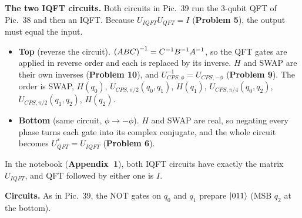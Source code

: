 \documentclass[a4paper, 10pt]{article}
\begin{document}
\begin{solution}
	\noindent \textbf{The two IQFT circuits.} Both circuits in Pic.~39 run the 3-qubit QFT of Pic.~38 and then an IQFT. Because \( U_{IQFT}U_{QFT} = I \) (\textbf{Problem 5}), the output must equal the input.
	\begin{itemize}
		\item \textbf{Top} (reverse the circuit). \( \left(ABC\right)^{-1} = C^{-1}B^{-1}A^{-1} \), so the QFT gates are applied in reverse order and each is replaced by its inverse. \( H \) and SWAP are their own inverses (\textbf{Problem 10}), and \( U_{CPS, \phi}^{-1} = U_{CPS, -\phi} \) (\textbf{Problem 9}).
		      The order is SWAP, \( H(q_0) \), \( U_{CPS, \pi/2}(q_0, q_1) \), \( H(q_1) \), \( U_{CPS, \pi/4}(q_0, q_2) \), \( U_{CPS, \pi/2}(q_1, q_2) \), \( H(q_2) \).
		\item \textbf{Bottom} (same circuit, \( \phi \to -\phi \)). \( H \) and SWAP are real, so negating every phase turns each gate into its complex conjugate, and the whole circuit becomes \( U_{QFT}^{*} = U_{IQFT} \) (\textbf{Problem 6}).
	\end{itemize}
	In the notebook (\textbf{Appendix~1}), both IQFT circuits have exactly the matrix \( U_{IQFT} \), and QFT followed by either one is \( I \).

	\myspace

	\noindent \textbf{Circuits.} As in Pic.~39, the NOT gates on \( q_0 \) and \( q_1 \) prepare \( \ket{011} \) (MSB \( q_2 \) at the bottom).

	\myspace


\end{solution}
\end{document}

